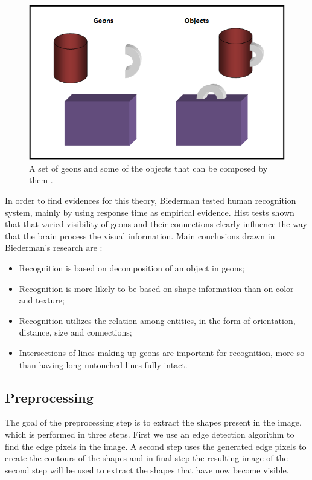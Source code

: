 \documentclass[9pt,shortpaper,twoside,web]{ieeecolor}
\begin{document}
\begin{figure}[htb]
\includegraphics[width=\columnwidth]{res/fig/ANNgeonsObjects.png}
\caption{A set of geons and some of the objects that can be composed by them \cite{b10}.}
\label{fig8}
\end{figure}

In order to find evidences for this theory, Biederman tested human recognition system, mainly by using response time as empirical evidence. Hist tests shown that that varied visibility of geons and their connections clearly influence the way that the brain process the visual information. Main conclusions drawn in Biederman's research are \cite{b10}:

\begin{itemize}
\item Recognition is based on decomposition of an object in geons;

\item Recognition is more likely to be based on shape information than on color and texture;

\item  Recognition utilizes the relation among entities, in the form of orientation, distance, size and connections;

\item Intersections of lines making up geons are important for recognition, more so than having long untouched lines fully intact.

\end{itemize}

\subsection{Preprocessing}
The goal of the preprocessing step is to extract the shapes present in the image, which is performed in three steps. First we use an edge detection algorithm to find the edge pixels in the image. A second step uses the generated edge pixels to create the contours of the shapes and  in final step the resulting image of the second step will be used to extract the shapes that have now become visible.
\end{document}
